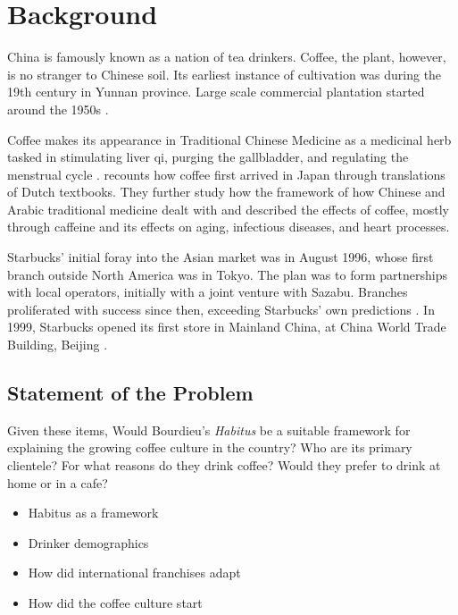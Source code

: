 \section{Background}\label{sec:background}

China is famously known as a nation of tea drinkers. Coffee, the plant, however,
is no stranger to Chinese soil. Its earliest instance of cultivation was during
the 19th century in Yunnan province. Large scale commercial plantation
started around the 1950s \autocite{zhang_coffee_2014}.

Coffee makes its appearance in Traditional Chinese Medicine as a medicinal herb
tasked in stimulating liver qi, purging the gallbladder, and regulating the
menstrual cycle \autocite{dharmananda_coffee_2003}.
\textcite{namba_historical_2001} recounts how coffee first arrived in Japan
through translations of Dutch textbooks. They further study how the framework of
how Chinese and Arabic traditional medicine dealt with and described the effects
of coffee, mostly through caffeine and its effects on aging, infectious
diseases, and heart processes.

Starbucks' initial foray into the Asian market was in August 1996, whose first
branch outside North America was in Tokyo. The plan was to form partnerships
with local operators, initially with a joint venture with Sazabu. Branches
proliferated with success since then, exceeding Starbucks' own predictions
\autocite{harrison_exporting_2005}. In 1999, Starbucks opened its first store in
Mainland China, at China World Trade Building, Beijing
\autocite{starbucks_corporation_history_????}.

\subsection{Statement of the Problem}

Given these items, Would Bourdieu's \emph{Habitus} be a suitable framework for
explaining the growing coffee culture in the country? Who are its primary
clientele? For what reasons do they drink coffee? Would they prefer to drink at
home or in a cafe?

\begin{itemize}
	\item Habitus as a framework
	\item Drinker demographics
	\item How did international franchises adapt
	\item How did the coffee culture start
\end{itemize}
